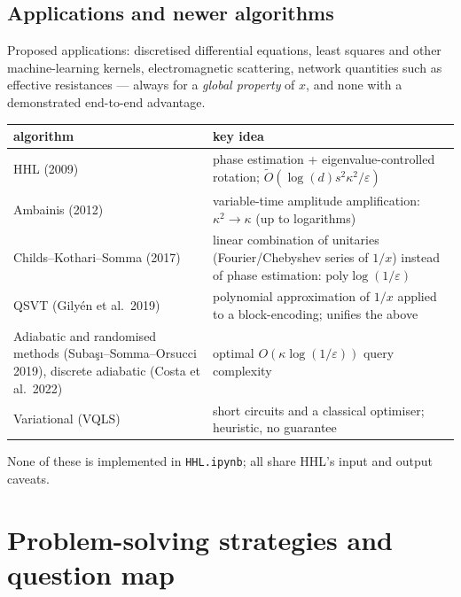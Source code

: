 \documentclass[11pt,a4paper,openany]{book}
\begin{document}
\subsection{Applications and newer algorithms}
Proposed applications: discretised differential equations, least squares and other machine-learning kernels, electromagnetic scattering, network
quantities such as effective resistances --- always for a \emph{global property} of $x$, and none with a demonstrated end-to-end advantage.
\begin{center}\small
\begin{tabularx}{\linewidth}{@{}>{\raggedright\arraybackslash}p{5.2cm}>{\raggedright\arraybackslash}X@{}}
\toprule algorithm & key idea\\ \midrule
HHL (2009) & phase estimation + eigenvalue-controlled rotation; $\tilde O(\log(d)s^2\kappa^2/\varepsilon)$\\
Ambainis (2012) & variable-time amplitude amplification: $\kappa^2 \to \kappa$ (up to logarithms)\\
Childs--Kothari--Somma (2017) & linear combination of unitaries (Fourier/Chebyshev series of $1/x$) instead of phase estimation: $\mathrm{poly}\log(1/\varepsilon)$\\
QSVT (Gilyén et al.\ 2019) & polynomial approximation of $1/x$ applied to a block-encoding; unifies the above\\
Adiabatic and randomised methods (Suba\c{s}\i--Somma--Orsucci 2019), discrete adiabatic (Costa et al.\ 2022) & optimal $O(\kappa\log(1/\varepsilon))$ query complexity\\
Variational (VQLS) & short circuits and a classical optimiser; heuristic, no guarantee\\ \bottomrule
\end{tabularx}
\end{center}
None of these is implemented in \texttt{HHL.ipynb}; all share HHL's input and output caveats.

\section{Problem-solving strategies and question map}
\end{document}
